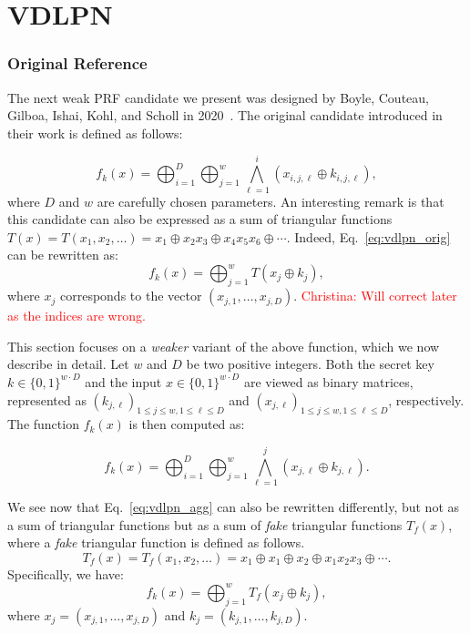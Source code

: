 \section{VDLPN}
\label{sec:vdlpn}


\subsubsection*{Original Reference}
The next weak PRF candidate we present was designed by Boyle, Couteau, Gilboa, Ishai, Kohl, and Scholl in 2020~\cite{vdlpn}. The original candidate introduced in their work is defined as follows:

\begin{equation} \label{eq:vdlpn_orig}
    f_k(x) = \bigoplus_{i=1}^D \bigoplus_{j=1}^w\bigwedge_{\ell=1}^i (x_{i,j,\ell} \oplus k_{i,j,\ell}),
\end{equation}
where $D$ and $w$ are carefully chosen parameters. An interesting remark is that this candidate can also be expressed as a sum of triangular functions $T(x) = T(x_1, x_2, \dots) = x_1 \oplus x_2x_3 \oplus x_4x_5x_6 \oplus \cdots$. Indeed, Eq.~\eqref{eq:vdlpn_orig} can be rewritten as:  
\[
    f_k(x) = \bigoplus_{j=1}^w T(x_j \oplus k_j),
\]
where $x_j$ corresponds to the vector $(x_{j, 1}, \dots, x_{j,D})$. \textcolor{red}{Christina: Will correct later as the indices are wrong.}

This section focuses on a \emph{weaker} variant of the above function, which we now describe in detail. Let $w$ and $D$ be two positive integers. Both the secret key $k \in \{0,1\}^{w \cdot D}$ and the input $x \in \{0,1\}^{w \cdot D}$ are viewed as binary matrices, represented as $(k_{j,\ell})_{1 \leq j \leq w, 1 \leq \ell \leq D}$ and $(x_{j,\ell})_{1 \leq j \leq w, 1 \leq \ell \leq D}$, respectively. The function $f_k(x)$ is then computed as:

\begin{equation} \label{eq:vdlpn_agg}
    f_k(x) = \bigoplus_{i=1}^D \bigoplus_{j=1}^w\bigwedge_{\ell=1}^j (x_{j,\ell} \oplus k_{j,\ell}).
\end{equation}

We see now that Eq.~\eqref{eq:vdlpn_agg} can also be rewritten differently, but not as a sum of triangular functions but as a sum of \emph{fake} triangular functions $T_f(x)$, where a \emph{fake} triangular function is defined as follows.
\[
    T_f(x) = T_f(x_1, x_2, \dots) = x_1 \oplus x_1 \oplus x_2 \oplus x_1x_2x_3 \oplus \cdots.
\]
Specifically, we have:
\[
    f_k(x) = \bigoplus_{j=1}^w T_f(x_j \oplus k_j),
\]
where $x_j = (x_{j, 1}, \dots, x_{j,D})$ and $k_j = (k_{j, 1}, \dots, k_{j,D})$.  

